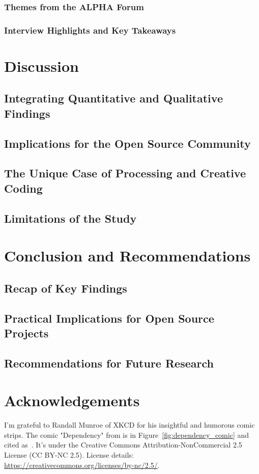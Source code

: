 \documentclass{article}
\newcommand{\getyear}[1]{\citeyear{#1}}
\begin{document}
\subsubsection{Themes from the ALPHA Forum}
\subsubsection{Interview Highlights and Key Takeaways}

\section{Discussion}

\subsection{Integrating Quantitative and Qualitative Findings}
\subsection{Implications for the Open Source Community}
\subsection{The Unique Case of Processing and Creative Coding}
\subsection{Limitations of the Study}

\section{Conclusion and Recommendations}

\subsection{Recap of Key Findings}
\subsection{Practical Implications for Open Source Projects}
\subsection{Recommendations for Future Research}

\section{Acknowledgements}
I'm grateful to Randall Munroe of XKCD for his insightful and humorous comic strips. The comic "Dependency" from \getyear{munroeDependency2020} is in Figure~\ref{fig:dependency_comic} and cited as~\cite{munroeDependency2020}. It's under the Creative Commons Attribution-NonCommercial 2.5 License (CC BY-NC 2.5). License details: \url{https://creativecommons.org/licenses/by-nc/2.5/}.
\end{document}
